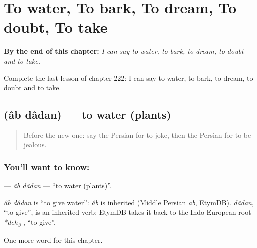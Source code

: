 
\chapter{To water, To bark, To dream, To doubt, To take}
\label{ch:fa-to-water-to-bark-to-dream-to-doubt-to-take}

\begin{chapteropening}
\textbf{By the end of this chapter:} \emph{I can say to water, to bark, to dream, to doubt and to take.}

Complete the last lesson of chapter 222: I can say to water, to bark, to dream, to doubt and to take.
\end{chapteropening}

\section[\texorpdfstring{\fa{آب} \fa{دادن} (âb dâdan)}{آب دادن (âb dâdan)}]{  (âb dâdan) — to water (plants)}

\label{lesson:FA-C222-ab-dadan}



\begin{quote}
Before the new one: say the Persian for to joke, then the Persian for to be jealous.
\end{quote}

\subsection*{You'll want to know:  }
\textbf{ } — \emph{âb dâdan} — \textquotedblleft{}to water (plants)\textquotedblright{}.

\begin{cousinweb}
\emph{âb dâdan} is \textquotedblleft{}to give water\textquotedblright{}: \emph{âb} is inherited (Middle Persian \emph{āb}, EtymDB). \emph{dâdan}, \textquotedblleft{}to give\textquotedblright{}, is an inherited verb; EtymDB takes it back to the Indo-European root \emph{*deh\textsubscript{3}-}, \textquotedblleft{}to give\textquotedblright{}.
\end{cousinweb}

\begin{grammarlens}[title={What you've built}]
One more word for this chapter.
\end{grammarlens}

